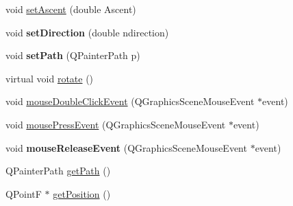 \begin{DoxyCompactItemize}
void \mbox{\hyperlink{class_tile_aa7621f21afe1b7405f56eef0c9c5a9fa}{set\+Ascent}} (double Ascent)
\item 
\mbox{\label{class_tile_acafc1364871ec146744f443612cab725}} 
void {\bfseries set\+Direction} (double ndirection)
\item 
\mbox{\label{class_tile_ac43fd9fe874ef4ed6155b796a7cec9f8}} 
void {\bfseries set\+Path} (Q\+Painter\+Path p)
\item 
virtual void \mbox{\hyperlink{class_tile_a15c3d8260c8950d3461e3ba2849cd141}{rotate}} ()
\item 
void \mbox{\hyperlink{class_tile_af1674a1e05675b4771e1b603ca385d42}{mouse\+Double\+Click\+Event}} (Q\+Graphics\+Scene\+Mouse\+Event $\ast$event)
\item 
void \mbox{\hyperlink{class_tile_aecbd71c0de7fe3fd79bb1b8bbca4f265}{mouse\+Press\+Event}} (Q\+Graphics\+Scene\+Mouse\+Event $\ast$event)
\item 
\mbox{\label{class_tile_a6be6db876fbc41e789dad725f954b705}} 
void {\bfseries mouse\+Release\+Event} (Q\+Graphics\+Scene\+Mouse\+Event $\ast$event)
\item 
Q\+Painter\+Path \mbox{\hyperlink{class_tile_a044239c0b2a4a24bf602ddba15ab0a01}{get\+Path}} ()
\item 
Q\+PointF $\ast$ \mbox{\hyperlink{class_tile_a8c2b6c2dfd8b381932454752558b1395}{get\+Position}} ()
\end{DoxyCompactItemize}
